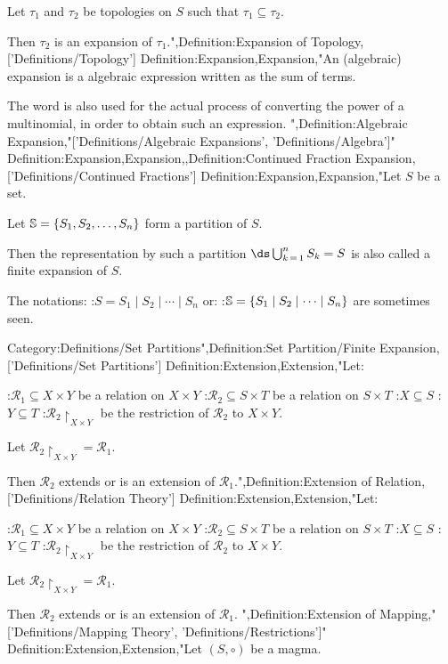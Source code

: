 Let $\tau_1$ and $\tau_2$ be topologies on $S$ such that $\tau_1 \subseteq \tau_2$.


Then $\tau_2$ is an expansion of $\tau_1$.",Definition:Expansion of Topology,['Definitions/Topology']
Definition:Expansion,Expansion,"An (algebraic) expansion is a algebraic expression written as the sum of terms.

The word is also used for the actual process of converting the power of a multinomial, in order to obtain such an expression.
",Definition:Algebraic Expansion,"['Definitions/Algebraic Expansions', 'Definitions/Algebra']"
Definition:Expansion,Expansion,,Definition:Continued Fraction Expansion,['Definitions/Continued Fractions']
Definition:Expansion,Expansion,"Let $S$ be a set.

Let $\Bbb S = \left\lbrace S_1, S_2, \ldots, S_n \right\rbrace$ form a partition of $S$.


Then the representation by such a partition $\ds \bigcup_{k \mathop = 1}^n S_k = S$ is also called a finite expansion of $S$.


The notations:
:$S = S_1 \mid S_2 \mid \cdots \mid S_n$
or:
:$\Bbb S = \left\lbrace S_1 \mid S_2 \mid \cdots \mid S_n \right\rbrace$
are sometimes seen.


Category:Definitions/Set Partitions",Definition:Set Partition/Finite Expansion,['Definitions/Set Partitions']
Definition:Extension,Extension,"Let:

:$\mathcal R_1 \subseteq X \times Y$ be a relation on $X \times Y$
:$\mathcal R_2 \subseteq S \times T$ be a relation on $S \times T$
:$X \subseteq S$
:$Y \subseteq T$
:$\mathcal R_2 \restriction_{X \times Y}$ be the restriction of $\mathcal R_2$ to $X \times Y$.


Let $\mathcal R_2 \restriction_{X \times Y} = \mathcal R_1$.


Then $\mathcal R_2$ extends or is an extension of $\mathcal R_1$.",Definition:Extension of Relation,['Definitions/Relation Theory']
Definition:Extension,Extension,"Let:

:$\mathcal R_1 \subseteq X \times Y$ be a relation on $X \times Y$
:$\mathcal R_2 \subseteq S \times T$ be a relation on $S \times T$
:$X \subseteq S$
:$Y \subseteq T$
:$\mathcal R_2 \restriction_{X \times Y}$ be the restriction of $\mathcal R_2$ to $X \times Y$.


Let $\mathcal R_2 \restriction_{X \times Y} = \mathcal R_1$.


Then $\mathcal R_2$ extends or is an extension of $\mathcal R_1$.
",Definition:Extension of Mapping,"['Definitions/Mapping Theory', 'Definitions/Restrictions']"
Definition:Extension,Extension,"Let $\left({S, \circ}\right)$ be a magma.

